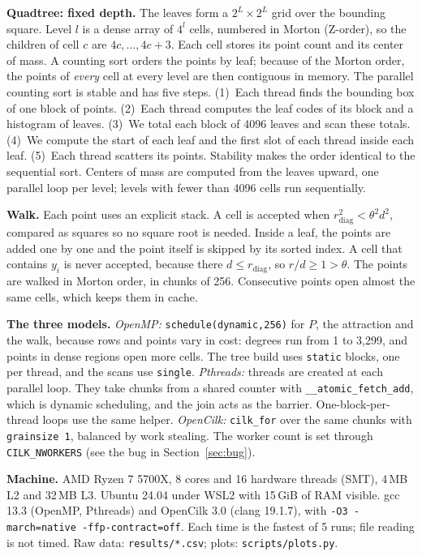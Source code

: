\documentclass[11pt,a4paper]{article}
\newcommand{\code}[1]{\texttt{#1}}
\begin{document}
\textbf{Quadtree: fixed depth.} The leaves form a $2^L\times2^L$ grid over the bounding square. Level $l$ is a dense array of $4^l$ cells, numbered in Morton (Z-order), so the children of cell $c$ are $4c,\dots,4c{+}3$.
Each cell stores its point count and its center of mass. A counting sort orders the points by leaf; because of the Morton order, the points of \emph{every} cell at every level are then contiguous in memory.
The parallel counting sort is stable and has five steps. (1)~Each thread finds the bounding box of one block of points. (2)~Each thread computes the leaf codes of its block and a histogram of leaves. (3)~We total each block of 4096 leaves and scan these totals. (4)~We compute the start of each leaf and the first slot of each thread inside each leaf. (5)~Each thread scatters its points.
Stability makes the order identical to the sequential sort. Centers of mass are computed from the leaves upward, one parallel loop per level; levels with fewer than 4096 cells run sequentially.

\textbf{Walk.} Each point uses an explicit stack. A cell is accepted when $r^2_{\text{diag}}<\theta^2 d^2$, compared as squares so no square root is needed. Inside a leaf, the points are added one by one and the point itself is skipped by its sorted index.
A cell that contains $y_i$ is never accepted, because there $d\le r_{\text{diag}}$, so $r/d\ge1>\theta$.
The points are walked in Morton order, in chunks of 256. Consecutive points open almost the same cells, which keeps them in cache.

\textbf{The three models.} \emph{OpenMP:} \code{schedule(dynamic,256)} for $P$, the attraction and the walk, because rows and points vary in cost: degrees run from 1 to 3{,}299, and points in dense regions open more cells. The tree build uses \code{static} blocks, one per thread, and the scans use \code{single}.
\emph{Pthreads:} threads are created at each parallel loop. They take chunks from a shared counter with \code{\_\_atomic\_fetch\_add}, which is dynamic scheduling, and the join acts as the barrier. One-block-per-thread loops use the same helper.
\emph{OpenCilk:} \code{cilk\_for} over the same chunks with \code{grainsize 1}, balanced by work stealing. The worker count is set through \code{CILK\_NWORKERS} (see the bug in Section~\ref{sec:bug}).

\textbf{Machine.} AMD Ryzen 7 5700X, 8 cores and 16 hardware threads (SMT), 4\,MB L2 and 32\,MB L3. Ubuntu 24.04 under WSL2 with 15\,GiB of RAM visible. gcc 13.3 (OpenMP, Pthreads) and OpenCilk 3.0 (clang 19.1.7), with \code{-O3 -march=native -ffp-contract=off}.
Each time is the fastest of 5 runs; file reading is not timed. Raw data: \code{results/*.csv}; plots: \code{scripts/plots.py}.
\end{document}

